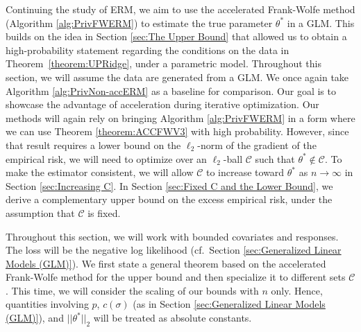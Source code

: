 \documentclass{article}
\begin{document}
Continuing the study of ERM, we aim to use the accelerated Frank-Wolfe method (Algorithm \ref{alg:PrivFWERM}) to estimate the true parameter $\theta^*$ in a GLM. This builds on the idea in Section \ref{sec:The Upper Bound} that allowed us to obtain a high-probability statement regarding the conditions on the data in Theorem~\ref{theorem:UPRidge}, under a parametric model. Throughout this section, we will assume the data are generated from a GLM. We once again take Algorithm \ref{alg:PrivNon-accERM} as a baseline for comparison. Our goal is to showcase the advantage of acceleration during iterative optimization. Our methods will again rely on bringing Algorithm \ref{alg:PrivFWERM} in a form where we can use Theorem \ref{theorem:ACCFWV3} with high probability. However, since that result requires a lower bound on the $\ell_2$-norm of the gradient of the empirical risk, we will need to optimize over an $\ell_2$-ball $\mathcal{C}$ such that $\theta^* \notin \mathcal{C}$. To make the estimator consistent, we will allow $\mathcal{C}$ to increase toward $\theta^*$ as $n \rightarrow \infty$ in Section \ref{sec:Increasing C}. In Section \ref{sec:Fixed C and the Lower Bound}, we derive a complementary upper bound on the excess empirical risk, under the assumption that $\mathcal{C}$ is fixed.

Throughout this section, we will work with bounded covariates and responses. The loss will be the negative log likelihood (cf.\ Section \ref{sec:Generalized Linear Models (GLM)}). We first state a general theorem based on the accelerated Frank-Wolfe method for the upper bound and then specialize it to different sets $\mathcal{C}$. %
This time, we will consider the scaling of our bounds with $n$ only. Hence, quantities involving $p$, $c(\sigma)$ (as in Section \ref{sec:Generalized Linear Models (GLM)}), and $||\theta^*||_2$ will be treated as absolute constants.
\end{document}
